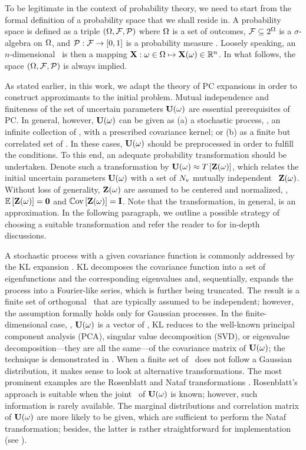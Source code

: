 To be legitimate in the context of probability theory, we need to start from the formal definition of a probability space that we shall reside in. A probability space is defined as a triple $(\Omega, \mathcal{F}, \mathcal{P})$ where $\Omega$ is a set of outcomes, $\mathcal{F} \subseteq 2^\Omega$ is a $\sigma$-algebra on $\Omega$, and $\mathcal{P}: \mathcal{F} \to [0, 1]$ is a probability measure \cite{durrett2010}. Loosely speaking, an $n$-dimensional \rv\ is then a mapping $\mathbf{X}: \omega \in \Omega \mapsto \mathbf{X}(\omega) \in \mathbb{R}^n$. In what follows, the space $(\Omega, \mathcal{F}, \mathcal{P})$ is always implied.

As stated earlier, in this work, we adapt the theory of PC expansions in order to construct approximants to the initial problem. Mutual independence and finiteness of the set of uncertain parameters $\mathbf{U}(\omega)$ are essential prerequisites of PC. In general, however, $\mathbf{U}(\omega)$ can be given as (a) a stochastic process, \ie, an infinite collection of \rvs, with a prescribed covariance kernel; or (b) as a finite but correlated set of \rvs. In these cases, $\mathbf{U}(\omega)$ should be preprocessed in order to fulfill the conditions. To this end, an adequate probability transformation should be undertaken. Denote such a transformation by $\mathbf{U}(\omega) \approx T\left[\mathbf{Z}(\omega)\right]$, which relates the initial uncertain parameters $\mathbf{U}(\omega)$ with a set of ${N_\text{v}}$ mutually independent \rvs\ $\mathbf{Z}(\omega)$. Without loss of generality, $\mathbf{Z}(\omega)$ are assumed to be centered and normalized, \ie, $\oExp{\vZ(\o)} = \mZero$ and $\oCov{\vZ(\o)} = \mI$. Note that the transformation, in general, is an approximation. In the following paragraph, we outline a possible strategy of choosing a suitable transformation and refer the reader to \cite{xiu2010, eldred2009} for in-depth discussions.

A stochastic process with a given covariance function is commonly addressed by the KL expansion \cite{xiu2010, maitre2010, ghanem1991}. KL decomposes the covariance function into a set of eigenfunctions and the corresponding eigenvalues and, sequentially, expands the process into a Fourier-like series, which is further being truncated. The result is a finite set of orthogonal \rvs\ that are typically assumed to be independent; however, the assumption formally holds only for Gaussian processes. In the finite-dimensional case, \ie, $\mathbf{U}(\omega)$ is a vector of \rvs, KL reduces to the well-known principal component analysis (PCA), singular value decomposition (SVD), or eigenvalue decomposition---they are all the same---of the covariance matrix of $\mathbf{U}(\omega)$; the technique is demonstrated in . When a finite set of \rvs\ does not follow a Gaussian distribution, it makes sense to look at alternative transformations. The most prominent examples are the Rosenblatt and Nataf transformations \cite{eldred2009, li2008}. Rosenblatt's approach is suitable when the joint \pdf\ of $\mathbf{U}(\omega)$ is known; however, such information is rarely available. The marginal distributions and correlation matrix of $\mathbf{U}(\omega)$ are more likely to be given, which are sufficient to perform the Nataf transformation; besides, the latter is rather straightforward for implementation (see \cite{li2008}).
